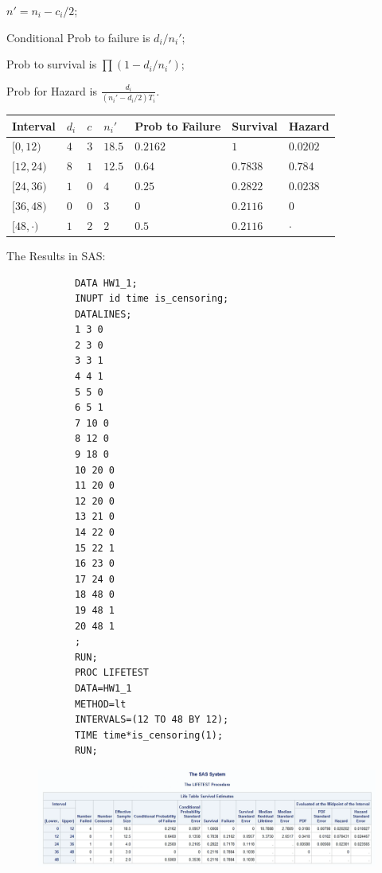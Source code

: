 \documentclass[12pt]{elegantbook}
\begin{document}
    \begin{solution}
        $n'=n_i-c_i/2$; 
        
        Conditional Prob to failure is $d_i/n_i'$;
        
        Prob to survival is $\prod (1-d_i/n_i')$; 

        Prob for Hazard is $\frac{d_i}{(n_i'-d_i/2)T_i}$.
        \begin{table}[h]
        \centering
        \begin{tabular}{lllllll}
        \hline
        Interval & $d_i$ & $c$ & $n_i'$ & Prob to Failure & Survival & Hazard \\ \hline
                $[0,12)$ &  $4$ & $3$  &  $18.5$  &     $0.2162$      &  $1$   &   $0.0202$   \\
                $[12,24)$ &  $8$ & $1$  &  $12.5$  &    $0.64$       &  $0.7838$   &   $0.784$   \\
                $[24,36)$ & $1$  & $0$  &  $4$  &     $0.25$      &  $0.2822$   &    $0.0238$  \\
                $[36,48)$ & $0$  & $0$  &  $3$  &    $0$       &  $0.2116$   &   $0$   \\
                $[48,\cdot)$ & $1$  &  $2$ &  $2$  &     $0.5$      &   $0.2116$  &   $\cdot$   \\ \hline
        \end{tabular}
        \end{table}

        The Results in SAS: 
        \begin{verbatim}
            DATA HW1_1;
            INUPT id time is_censoring;
            DATALINES;
            1 3 0
            2 3 0
            3 3 1
            4 4 1
            5 5 0
            6 5 1
            7 10 0
            8 12 0
            9 18 0
            10 20 0
            11 20 0
            12 20 0
            13 21 0
            14 22 0
            15 22 1
            16 23 0
            17 24 0
            18 48 0
            19 48 1
            20 48 1
            ;
            RUN;
            PROC LIFETEST 
            DATA=HW1_1 
            METHOD=lt 
            INTERVALS=(12 TO 48 BY 12);
            TIME time*is_censoring(1);
            RUN;
        \end{verbatim}
        \begin{figure}[h]
        \centering
        \includegraphics[width=\textwidth]{HW1_1.png}
        \end{figure}
    \end{solution}
\end{document}
